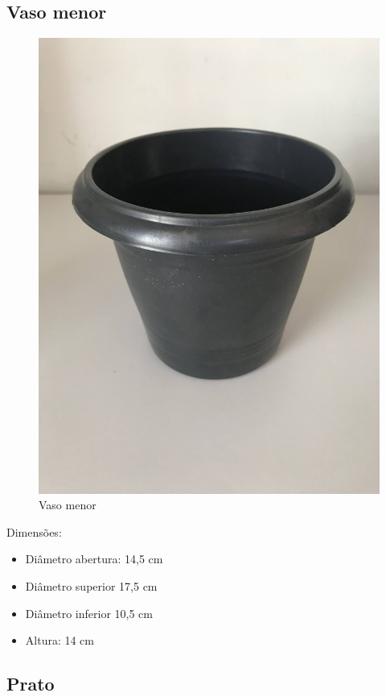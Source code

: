 \documentclass[
	12pt,				%
	openright,			%
	oneside,			%
	a4paper,			%
	chapter=TITLE,		%
	english,			%
	brazil				%
	]{abntex2}
\begin{document}
\subsection{Vaso menor}

\begin{figure}[H]
    \centering
    \includegraphics[scale=0.04, angle=-90]{imagens/IMG_0600.jpg}
    \caption{Vaso menor}
    \label{fig:vasomenor}
\end{figure}        
Dimensões: 

\begin{itemize}
    \item Diâmetro abertura: 14,5 cm
    \item Diâmetro superior 17,5 cm
    \item Diâmetro inferior 10,5 cm
    \item Altura: 14 cm
\end{itemize}

\subsection{Prato}
\end{document}

